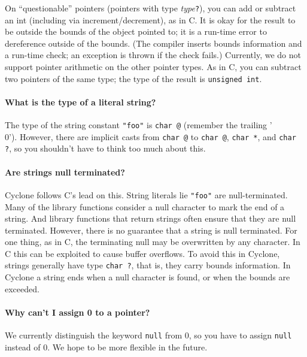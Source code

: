 On ``questionable'' pointers (pointers with type
\textit{type}\texttt{?}), you can add or subtract an int (including
via increment/decrement), as in C\@.  It is okay for the result to be
outside the bounds of the object pointed to; it is a run-time error to
dereference outside of the bounds.  (The compiler inserts bounds
information and a run-time check; an exception is thrown if the check
fails.)  Currently, we do not support pointer arithmetic on the other
pointer types.  As in C, you can subtract two pointers of the same
type; the type of the result is \texttt{unsigned int}.

\paragraph{What is the type of a literal string?}

The type of the string constant \texttt{"foo"} is \texttt{char @\rb} (remember the trailing '\\0').  However, there are implicit
casts from \texttt{char @\rb} to \texttt{char @\rb},
\texttt{char *\rb}, and \texttt{char ?}, so you shouldn't have to
think too much about this.

\paragraph{Are strings null terminated?}

Cyclone follows C's lead on this.  String literals lie \texttt{"foo"}
are null-terminated.  Many of the library functions consider a null
character to mark the end of a string.  And library functions that
return strings often ensure that they are null terminated.  However,
there is no guarantee that a string is null terminated.  For one
thing, as in C, the terminating null may be overwritten by any
character.  In C this can be exploited to cause buffer overflows.  To
avoid this in Cyclone, strings generally have type \texttt{char ?},
that is, they carry bounds information.  In Cyclone a string ends when
a null character is found, or when the bounds are exceeded.

\paragraph{Why can't I assign 0 to a pointer?}

We currently distinguish the keyword \texttt{null} from 0, so you have
to assign \texttt{null} instead of 0.  We hope to be more flexible in
the future.

